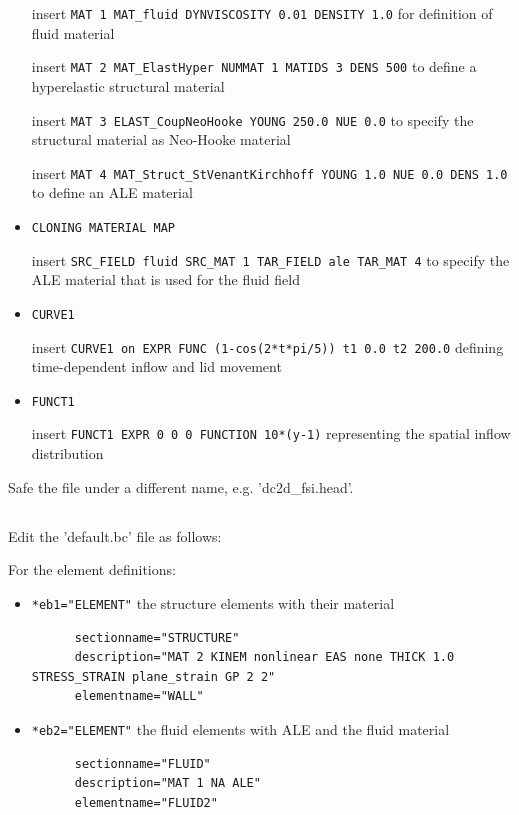 \begin{itemize}
 insert \verb|MAT 1 MAT_fluid DYNVISCOSITY 0.01 DENSITY 1.0| for definition of
 fluid material
 
 insert \verb|MAT 2 MAT_ElastHyper NUMMAT 1 MATIDS 3 DENS 500| to define a
 hyperelastic structural material

 insert \verb|MAT 3 ELAST_CoupNeoHooke YOUNG 250.0 NUE 0.0| to specify the
 structural material as Neo-Hooke material
 
 insert \verb|MAT 4 MAT_Struct_StVenantKirchhoff YOUNG 1.0 NUE 0.0 DENS 1.0| to
 define an ALE material

 \item \verb|CLONING MATERIAL MAP|

 insert \verb|SRC_FIELD fluid SRC_MAT 1 TAR_FIELD ale TAR_MAT 4| to specify the
 ALE material that is used for the fluid field 

 \item \verb|CURVE1|

 insert \verb|CURVE1 on EXPR FUNC (1-cos(2*t*pi/5)) t1 0.0 t2 200.0| defining
time-dependent inflow and lid movement
 
  \item \verb|FUNCT1|

 insert \verb|FUNCT1 EXPR 0 0 0 FUNCTION 10*(y-1)| representing the spatial
 inflow distribution

\end{itemize}
Safe the file under a different name, e.g. 'dc2d\_fsi.head'.

\subsection{\bc}
Edit the 'default.bc' file as follows:

For the element definitions:

\begin{itemize}
  \item \verb|*eb1="ELEMENT"| \qquad the structure elements with their material
  \begin{small} \begin{verbatim}
      sectionname="STRUCTURE"
      description="MAT 2 KINEM nonlinear EAS none THICK 1.0 STRESS_STRAIN plane_strain GP 2 2"
      elementname="WALL"
    \end{verbatim} 
  \end{small}
 
 \item \verb|*eb2="ELEMENT"| \qquad the fluid elements with ALE and the
 fluid material
 \begin{small} \begin{verbatim}
      sectionname="FLUID"
      description="MAT 1 NA ALE"
      elementname="FLUID2"
    \end{verbatim} 
  \end{small}
\end{itemize}

